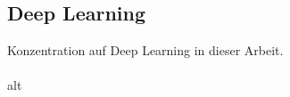\documentclass[12pt,oneside,a4paper,parskip]{scrbook}
\begin{document}
\subsection{Deep Learning}
Konzentration auf Deep Learning in dieser Arbeit.
\\\\
alt
\\\\
\end{document}
